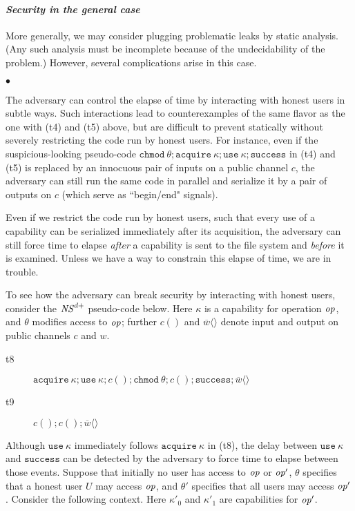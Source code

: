 \documentclass[10pt]{article}
\newenvironment{mylist}
    {\begin{list}{$\bullet$}{\setlength{\leftmargin}{0.5cm}}}
    {\end{list}}
\newcommand{\op}{{\it op}}
\newcommand{\tup}[1]{\langle #1\rangle}
\begin{document}
\paragraph{\em Security in the general case}
More generally, we may consider plugging problematic leaks by static analysis. (Any such analysis must be incomplete because of the undecidability of the problem.) However, several  complications arise in this case. 
\begin{mylist}
\item The adversary can control the elapse of time by interacting with honest users in subtle ways. Such interactions lead to counterexamples of the same flavor as the one with (t4) and (t5) above, but are difficult to prevent statically without severely restricting the code run by honest users. For instance, even if the suspicious-looking pseudo-code $\mathtt{chmod}~\theta; \mathtt{acquire}~\kappa; \mathtt{use}~\kappa; \mathtt{success}$ in (t4) and (t5) is replaced by an innocuous pair of inputs on a public channel $c$, the adversary can still run the same code in parallel and serialize it by a pair of outputs on $c$ (which serve as ``begin/end" signals).
\item Even if we restrict the code run by honest users, such that every use of a capability can be serialized immediately after its acquisition, the adversary can still force time to elapse \emph{after} a capability is sent to the file system and \emph{before} it is examined. Unless we have a way to constrain this elapse of time, we are in trouble. 
\end{mylist}
To see how the adversary can break security by interacting with honest users, consider the ${\it NS}^{d+}$ pseudo-code below. Here $\kappa$ is a capability for operation $\op$, and $\theta$ modifies access to $\op$; further $c()$ and $\overline w\tup{}$ denote input and output on public channels $c$ and $w$. 
\begin{description}
\item[t8] $\mathtt{acquire}\:\kappa; \mathtt{use}\:\kappa; c(); \mathtt{chmod}\:\theta; c(); \mathtt{success}; \overline w\tup{}$
\item[t9] $c(); c(); \overline w\tup{}$
\end{description}
Although $\mathtt{use}\:\kappa$ immediately follows $\mathtt{acquire}\:\kappa$ in (t8), the delay between $\mathtt{use}\:\kappa$ and $\mathtt{success}$ can be detected by the adversary to force time to elapse between those events. Suppose that initially no user has access to $\op$ or $\op'$, $\theta$ specifies that a honest user $U$ may access $\op$, and $\theta'$ specifies that all users may access $\op'$. Consider the following context. Here $\kappa'_0$ and $\kappa'_1$ are capabilities for $\op'$.
\end{document}
